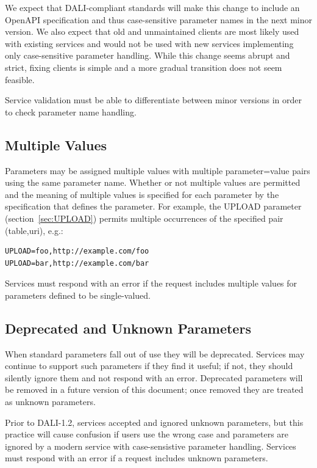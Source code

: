 \documentclass[11pt,letter]{ivoa}
\begin{document}
We expect that DALI-compliant standards will make this change to include an OpenAPI
specification and thus case-sensitive parameter names in the next minor version. We
also expect that old and unmaintained clients are most likely used with existing services
and would not be used with new services implementing only case-sensitive parameter handling.
While this change seems abrupt and strict, fixing clients is simple and a more gradual
transition does not seem feasible.

Service validation must be able to differentiate between minor versions in order to
check parameter name handling.

\subsection{Multiple Values}
Parameters may be assigned multiple values with multiple parameter=value pairs
using the same parameter name. Whether or not multiple values are permitted and
the meaning of multiple values is specified for each parameter by the
specification that defines the parameter. For example, the UPLOAD parameter
(section~\ref{sec:UPLOAD}) permits multiple occurrences of the specified
pair (table,uri), e.g.:

\begin{verbatim}
UPLOAD=foo,http://example.com/foo
UPLOAD=bar,http://example.com/bar
\end{verbatim}

Services must respond with an error if the request includes multiple values for
parameters defined to be single-valued.

\subsection{Deprecated and Unknown Parameters}
\label{sec:unknown-parameters}
When standard parameters fall out of use they will be deprecated. Services may continue
to support such parameters if they find it useful; if not, they should silently ignore them
and not respond with an error. Deprecated parameters will be removed in a future version
of this document; once removed they are treated as unknown parameters.

Prior to DALI-1.2, services accepted and ignored unknown parameters, but this practice
will cause confusion if users use the wrong case and parameters are ignored by a
modern service with case-sensistive parameter handling. Services must respond with
an error if a request includes unknown parameters.
\end{document}

